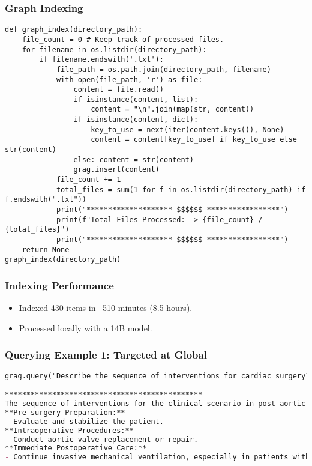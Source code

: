 \begin{frame}[fragile]\frametitle{Graph Indexing}
    \begin{lstlisting}
def graph_index(directory_path):
    file_count = 0 # Keep track of processed files.
    for filename in os.listdir(directory_path):
        if filename.endswith('.txt'):
            file_path = os.path.join(directory_path, filename)
            with open(file_path, 'r') as file:
                content = file.read()
                if isinstance(content, list):
                    content = "\n".join(map(str, content))
                if isinstance(content, dict):
                    key_to_use = next(iter(content.keys()), None)
                    content = content[key_to_use] if key_to_use else str(content)
                else: content = str(content)   
                grag.insert(content)
            file_count += 1
            total_files = sum(1 for f in os.listdir(directory_path) if f.endswith(".txt"))
            print("******************** $$$$$$ *****************")        
            print(f"Total Files Processed: -> {file_count} / {total_files}")
            print("******************** $$$$$$ *****************")  
    return None
graph_index(directory_path)
    \end{lstlisting}
\end{frame}

\begin{frame}[fragile]\frametitle{Indexing Performance}
    \begin{itemize}
        \item Indexed 430 items in ~510 minutes (8.5 hours).
        \item Processed locally with a 14B model.
    \end{itemize}
\end{frame}

\begin{frame}[fragile]\frametitle{Querying Example 1: Targeted at Global}
    \begin{lstlisting}[language=markdown]
    grag.query("Describe the sequence of interventions for cardiac surgery?").response

**********************************************
The sequence of interventions for the clinical scenario in post-aortic valve repair surgery with complications like respiratory issues, neurological impairment, and renal failure includes:
**Pre-surgery Preparation:**
- Evaluate and stabilize the patient.
**Intraoperative Procedures:**
- Conduct aortic valve replacement or repair.
**Immediate Postoperative Care:**
- Continue invasive mechanical ventilation, especially in patients with respiratory issues or neurological impairments preoperatively.
    \end{lstlisting}

\end{frame}

